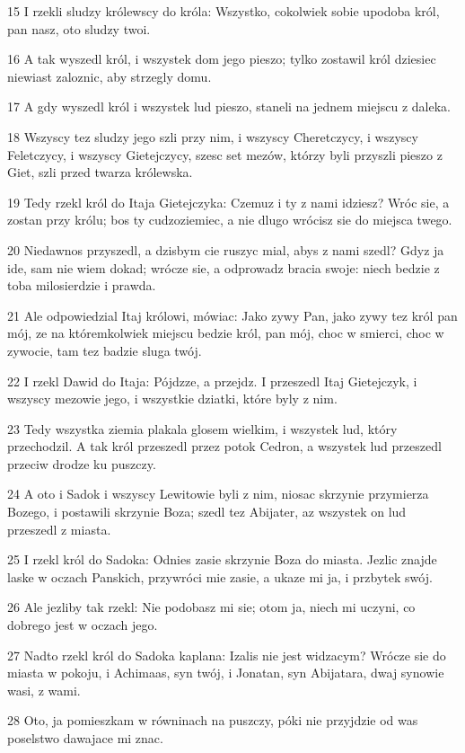 \par 15 I rzekli sludzy królewscy do króla: Wszystko, cokolwiek sobie upodoba król, pan nasz, oto sludzy twoi.
\par 16 A tak wyszedl król, i wszystek dom jego pieszo; tylko zostawil król dziesiec niewiast zaloznic, aby strzegly domu.
\par 17 A gdy wyszedl król i wszystek lud pieszo, staneli na jednem miejscu z daleka.
\par 18 Wszyscy tez sludzy jego szli przy nim, i wszyscy Cheretczycy, i wszyscy Feletczycy, i wszyscy Gietejczycy, szesc set mezów, którzy byli przyszli pieszo z Giet, szli przed twarza królewska.
\par 19 Tedy rzekl król do Itaja Gietejczyka: Czemuz i ty z nami idziesz? Wróc sie, a zostan przy królu; bos ty cudzoziemiec, a nie dlugo wrócisz sie do miejsca twego.
\par 20 Niedawnos przyszedl, a dzisbym cie ruszyc mial, abys z nami szedl? Gdyz ja ide, sam nie wiem dokad; wrócze sie, a odprowadz bracia swoje: niech bedzie z toba milosierdzie i prawda.
\par 21 Ale odpowiedzial Itaj królowi, mówiac: Jako zywy Pan, jako zywy tez król pan mój, ze na któremkolwiek miejscu bedzie król, pan mój, choc w smierci, choc w zywocie, tam tez badzie sluga twój.
\par 22 I rzekl Dawid do Itaja: Pójdzze, a przejdz. I przeszedl Itaj Gietejczyk, i wszyscy mezowie jego, i wszystkie dziatki, które byly z nim.
\par 23 Tedy wszystka ziemia plakala glosem wielkim, i wszystek lud, który przechodzil. A tak król przeszedl przez potok Cedron, a wszystek lud przeszedl przeciw drodze ku puszczy.
\par 24 A oto i Sadok i wszyscy Lewitowie byli z nim, niosac skrzynie przymierza Bozego, i postawili skrzynie Boza; szedl tez Abijater, az wszystek on lud przeszedl z miasta.
\par 25 I rzekl król do Sadoka: Odnies zasie skrzynie Boza do miasta. Jezlic znajde laske w oczach Panskich, przywróci mie zasie, a ukaze mi ja, i przbytek swój.
\par 26 Ale jezliby tak rzekl: Nie podobasz mi sie; otom ja, niech mi uczyni, co dobrego jest w oczach jego.
\par 27 Nadto rzekl król do Sadoka kaplana: Izalis nie jest widzacym? Wrócze sie do miasta w pokoju, i Achimaas, syn twój, i Jonatan, syn Abijatara, dwaj synowie wasi, z wami.
\par 28 Oto, ja pomieszkam w równinach na puszczy, póki nie przyjdzie od was poselstwo dawajace mi znac.
